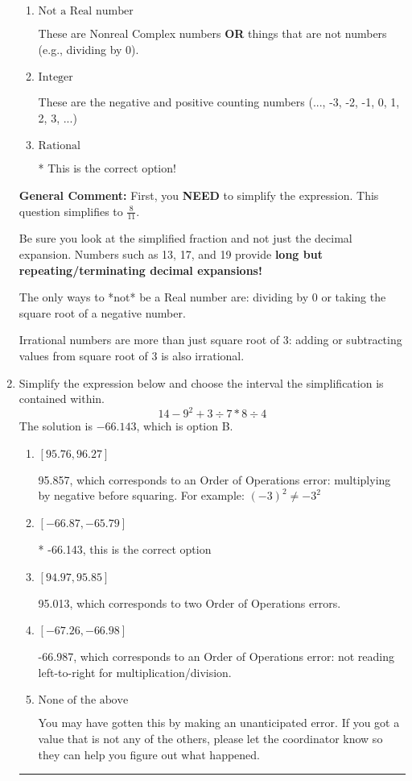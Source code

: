 \documentclass{extbook}[14pt]
\newcommand{\litem}[1]{\item #1

\rule{\textwidth}{0.4pt}}
\begin{document}
\begin{enumerate}
{\begin{enumerate}[label=\Alph*.]
These cannot be written as a fraction of Integers.
\item \( \text{Not a Real number} \)

These are Nonreal Complex numbers \textbf{OR} things that are not numbers (e.g., dividing by 0).
\item \( \text{Integer} \)

These are the negative and positive counting numbers (..., -3, -2, -1, 0, 1, 2, 3, ...)
\item \( \text{Rational} \)

* This is the correct option!
\end{enumerate}

\textbf{General Comment:} First, you \textbf{NEED} to simplify the expression. This question simplifies to $\frac{8}{11}$. 
 
 Be sure you look at the simplified fraction and not just the decimal expansion. Numbers such as 13, 17, and 19 provide \textbf{long but repeating/terminating decimal expansions!} 
 
 The only ways to *not* be a Real number are: dividing by 0 or taking the square root of a negative number. 
 
 Irrational numbers are more than just square root of 3: adding or subtracting values from square root of 3 is also irrational.
}
\litem{
Simplify the expression below and choose the interval the simplification is contained within.
\[ 14 - 9^2 + 3 \div 7 * 8 \div 4 \]The solution is \( -66.143 \), which is option B.\begin{enumerate}[label=\Alph*.]
\item \( [95.76, 96.27] \)

 95.857, which corresponds to an Order of Operations error: multiplying by negative before squaring. For example: $(-3)^2 \neq -3^2$
\item \( [-66.87, -65.79] \)

* -66.143, this is the correct option
\item \( [94.97, 95.85] \)

 95.013, which corresponds to two Order of Operations errors.
\item \( [-67.26, -66.98] \)

 -66.987, which corresponds to an Order of Operations error: not reading left-to-right for multiplication/division.
\item \( \text{None of the above} \)

 You may have gotten this by making an unanticipated error. If you got a value that is not any of the others, please let the coordinator know so they can help you figure out what happened.
\end{enumerate}

}
\end{enumerate}
\end{document}
